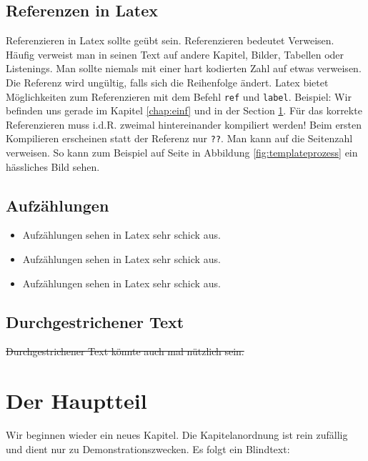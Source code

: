 \documentclass[11pt,a4paper]{report}
\newcommand*\falsch{\st}
\begin{document}
\section{Referenzen in Latex} \label{sec:ref}
Referenzieren in Latex sollte geübt sein. Referenzieren bedeutet Verweisen. Häufig verweist man in seinen Text auf andere Kapitel, Bilder, Tabellen oder Listenings. Man sollte niemals mit einer hart kodierten Zahl auf etwas verweisen. Die Referenz wird ungültig, falls sich die Reihenfolge ändert. Latex bietet Möglichkeiten zum Referenzieren mit dem Befehl \verb|ref| und \verb|label|. Beispiel: Wir befinden uns gerade im Kapitel \ref{chap:einf} und in der Section \ref{sec:ref}. Für das korrekte Referenzieren muss i.d.R. zweimal hintereinander kompiliert werden! Beim ersten Kompilieren erscheinen statt der Referenz nur \verb|??|. Man kann auf die Seitenzahl verweisen. So kann zum Beispiel auf Seite \pageref{fig:templateprozess} in Abbildung \ref{fig:templateprozess} ein hässliches Bild sehen.


\section{Aufzählungen} \label{sec:num}
\begin{itemize}
	\item Aufzählungen sehen in Latex sehr schick aus.
	\item Aufzählungen sehen in Latex sehr schick aus.
	\item Aufzählungen sehen in Latex sehr schick aus.
\end{itemize}

\section{Durchgestrichener Text} \label{sec:durchgestrichen}
\falsch{Durchgestrichener Text könnte auch mal nützlich sein.}

\chapter{Der Hauptteil} \label{chap:hauptteil}

Wir beginnen wieder ein neues Kapitel. Die Kapitelanordnung ist rein zufällig und dient nur zu Demonstrationszwecken.
Es folgt ein Blindtext: \blindtext
\end{document}
